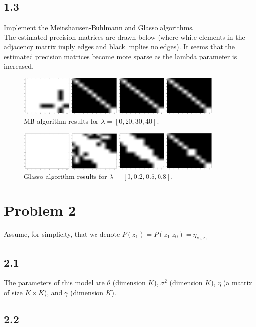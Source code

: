 \documentclass[12pt]{article}
\begin{document}
\subsection*{1.3}
Implement the Meinshausen-Buhlmann and Glasso algorithms.\\

The estimated precision matrices are drawn below (where white elements in the adjacency matrix imply edges and black implies no edges). It seems that the estimated precision matrices become more sparse as the lambda parameter is increased.
\begin{figure}[h!]
    \centering
    \includegraphics[width=0.9\textwidth]{precImg/mbPrec.pdf}
    \caption{MB algorithm results for $\lambda = [0,20,30,40]$.}
\end{figure}
\begin{figure}[h!]
    \centering
    \includegraphics[width=0.9\textwidth]{precImg/glPrec.pdf}
    \caption{Glasso algorithm results for $\lambda = [0,0.2,0.5,0.8]$.}
\end{figure}



\section*{Problem 2}
\label{sec:prob2}
Assume, for simplicity, that we denote $P(z_1) = P(z_1 | z_0) = \eta_{z_0,z_1}$

\subsection*{2.1}
The parameters of this model are $\theta$ (dimension $K$), $\sigma^2$ (dimension $K$), $\eta$ (a matrix of size $K \times K$), and $\gamma$ (dimension $K$).

\subsection*{2.2}
\end{document}
